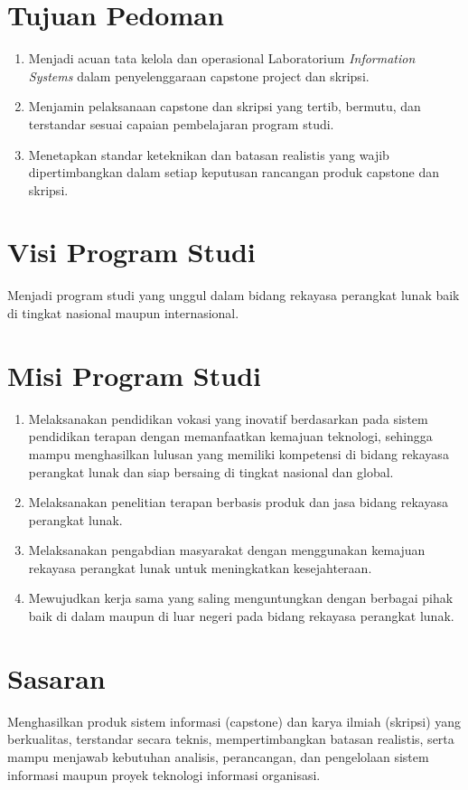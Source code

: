 \documentclass[12pt,a4paper]{report}
\begin{document}
\section{Tujuan Pedoman}
\begin{enumerate}
\item Menjadi acuan tata kelola dan operasional Laboratorium \emph{Information Systems} dalam penyelenggaraan capstone project dan skripsi.
\item Menjamin pelaksanaan capstone dan skripsi yang tertib, bermutu, dan terstandar sesuai capaian pembelajaran program studi.
\item Menetapkan standar keteknikan dan batasan realistis yang wajib dipertimbangkan dalam setiap keputusan rancangan produk capstone dan skripsi.
\end{enumerate}

\section{Visi Program Studi}
Menjadi program studi yang unggul dalam bidang rekayasa perangkat lunak baik di tingkat nasional maupun internasional.

\section{Misi Program Studi}
\begin{enumerate}
\item Melaksanakan pendidikan vokasi yang inovatif berdasarkan pada sistem pendidikan terapan dengan memanfaatkan kemajuan teknologi, sehingga mampu menghasilkan lulusan yang memiliki kompetensi di bidang re\-ka\-ya\-sa pe\-rang\-kat lu\-nak dan siap bersaing di tingkat nasional dan global.
\item Melaksanakan penelitian terapan berbasis produk dan jasa bidang rekayasa perangkat lunak.
\item Melaksanakan pengabdian masyarakat dengan menggunakan kemajuan rekayasa perangkat lunak untuk meningkatkan kesejahteraan.
\item Mewujudkan kerja sama yang saling menguntungkan dengan berbagai pihak baik di dalam maupun di luar negeri pada bidang rekayasa perangkat lunak.
\end{enumerate}

\section{Sasaran}
Menghasilkan produk sistem informasi (capstone) dan karya ilmiah (skripsi) yang berkualitas, terstandar secara teknis, mempertimbangkan batasan realistis, serta mampu menjawab kebutuhan analisis, perancangan, dan pengelolaan sistem informasi maupun proyek teknologi informasi organisasi.
\end{document}
